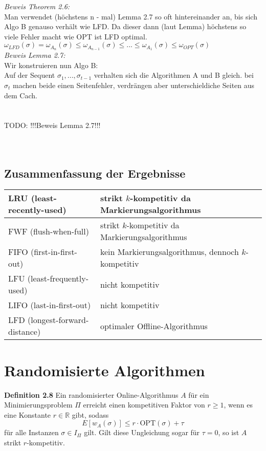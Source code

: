 \textit{Beweis Theorem 2.6:}\\
Man verwendet (höchstens n - mal) Lemma 2.7 so oft hintereinander an, bis sich Algo B genauso verhält wie LFD. Da dieser dann (laut Lemma) höchstens so viele Fehler macht wie OPT ist LFD optimal.\\
$\omega_{LFD}(\sigma) = \omega_{A_{n}}(\sigma) \le \omega_{A_{n-1}}(\sigma) \le ... \le \omega_{A_{1}}(\sigma) \le \omega_{OPT}(\sigma)$ \\

\textit{Beweis Lemma 2.7:}\\
Wir konstruieren nun Algo B: \\
Auf der Sequent $\sigma_{1}, ..., \sigma_{t-1}$ verhalten sich die Algorithmen A und B gleich. bei $\sigma_{t}$ machen beide einen Seitenfehler, verdrängen aber unterschieldiche Seiten aus dem Cach.
\\
\\
\\
TODO: !!!Beweis Lemma 2.7!!!
\\
\\
\\

\subsection{Zusammenfassung der Ergebnisse}

\begin{tabular}{| l | l |}
\hline
LRU (least-recently-used)   & strikt $k$-kompetitiv da Markierungsalgorithmus \\ \hline
FWF (flush-when-full)     & strikt $k$-kompetitiv da Markierungsalgorithmus \\ \hline
FIFO (first-in-first-out)   & kein Markierungsalgorithmus, dennoch $k$-kompetitiv \\ \hline
LFU (least-frequently-used)   & nicht kompetitiv\\ \hline
LIFO (last-in-first-out)    & nicht kompetitiv\\ \hline
LFD (longest-forward-distance)& optimaler Offline-Algorithmus \\ \hline
\end{tabular}



\section{Randomisierte Algorithmen}


\textbf{Definition 2.8} Ein randomisierter Online-Algorithmus $A$ für ein Minimierungsproblem $\Pi$ erreicht einen kompetitiven Faktor von $r \ge 1$, wenn es eine Konstante $r \in \mathbb{R}$ gibt, sodass
$$E[w_A(\sigma)] \leq r \cdot \textrm{OPT}(\sigma) + \tau$$
für alle Instanzen $\sigma \in I_\Pi$ gilt. Gilt diese Ungleichung sogar für $\tau = 0$, so ist $A$ strikt $r$-kompetitiv.

